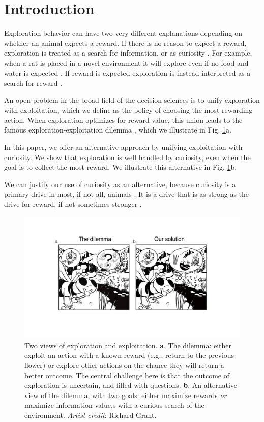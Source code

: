 \section*{Introduction}
Exploration behavior can have two very different explanations depending on whether an animal expects a reward. If there is no reason to expect a reward, exploration is treated as a search for information, or as curiosity \cite{Berlyne1950,Schmidhuber1991,Kidd2015,Jaegle2019,Sumner2019,Wang2019,Auersperg2015}. For example, when a rat is placed in a novel environment it will explore even if no food and water is expected \cite{Berlyne1950,Rosenberg2021}. If reward is expected exploration is instead interpreted as a search for reward \cite{Gupta2006,Sutton2018,Woodgate2017,Lee2011a,Schulz2018a,Calhoun2014}. 

An open problem in the broad field of the decision sciences is to unify exploration with exploitation, which we define as the policy of choosing the most rewarding action. When exploration optimizes for reward value, this union leads to the famous exploration-exploitation dilemma \cite{Kelly1956,Berger-Tal2014,Dayan1996,Thrun1992,Mehlhorn2015,Kobayashi2019}, which we illustrate in Fig. \ref{fig:bee}a.

In this paper, we offer an alternative approach by unifying exploitation with curiosity. We show that exploration is well handled by curiosity, even when the goal is to collect the most reward. We illustrate this alternative in Fig. \ref{fig:bee}b. 

We can justify our use of curiosity as an alternative, because curiosity is a primary drive in most, if not all, animals \cite{Berlyne1950,Loewenstein1994,Inglis2001}. It is a drive that is as strong as the drive for reward, if not sometimes stronger \cite{Loewenstein1994,Kidd2015,Gottlieb2018,Sumner2019,Gopnik2020,Song2019,Wang2019}. 

\begin{figure}
	\includegraphics[width=.9\linewidth]{img/bee.pdf} 
	\caption{Two views of exploration and exploitation. \textbf{a}. The dilemma: either exploit an action with a known reward (e.g., return to the previous flower) or explore other actions on the chance they will return a better outcome. The central challenge here is that the outcome of exploration is uncertain, and filled with questions. \textbf{b}. An alternative view of the dilemma, with two goals: either maximize rewards \textit{or} maximize information value,s with a curious search of the environment. \textit{Artist credit}: Richard Grant.}
	\label{fig:bee} 
\end{figure}

